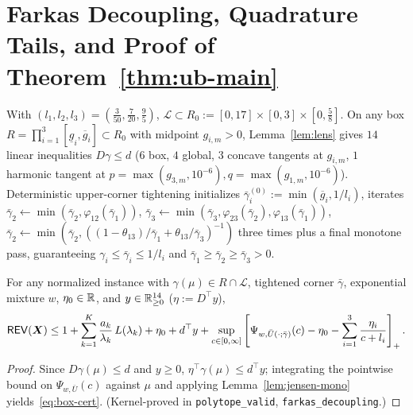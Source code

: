 \section{Farkas Decoupling, Quadrature Tails, and Proof of Theorem~\texorpdfstring{\ref{thm:ub-main}}{1.1}}\label{sec:ub-farkas}

With $(l_1,l_2,l_3) = (\frac{3}{50},\frac{7}{20},\frac{9}{5})$, $\mathcal{L} \subset R_0 := [0,17] \times [0,3] \times [0,\frac{5}{8}]$. On any box $R = \prod_{i=1}^3 [\underline{g}_i,\overline{g}_i] \subset R_0$ with midpoint $g_{i,m} > 0$, Lemma~\ref{lem:lens} gives $14$ linear inequalities $D\gamma \le d$ ($6$ box, $4$ global, $3$ concave tangents at $g_{i,m}$, $1$ harmonic tangent at $p = \max(g_{3,m}, 10^{-6}), q = \max(g_{1,m}, 10^{-6})$). Deterministic upper-corner tightening initializes $\bar{\gamma}_i^{(0)} := \min(\overline{g}_i, 1/l_i)$, iterates $\bar{\gamma}_2 \leftarrow \min(\bar{\gamma}_2, \varphi_{12}(\bar{\gamma}_1))$, $\bar{\gamma}_3 \leftarrow \min(\bar{\gamma}_3, \varphi_{23}(\bar{\gamma}_2), \varphi_{13}(\bar{\gamma}_1))$, $\bar{\gamma}_2 \leftarrow \min(\bar{\gamma}_2, ((1-\theta_{13})/\bar{\gamma}_1 + \theta_{13}/\bar{\gamma}_3)^{-1})$ three times plus a final monotone pass, guaranteeing $\gamma_i \le \bar{\gamma}_i \le 1/l_i$ and $\bar{\gamma}_1 \ge \bar{\gamma}_2 \ge \bar{\gamma}_3 > 0$.

\begin{lemma}\label{lem:farkas}
For any normalized instance with $\gamma(\mu) \in R \cap \mathcal{L}$, tightened corner $\bar{\gamma}$, exponential mixture $w$, $\eta_0 \in \mathbb{R}$, and $y \in \mathbb{R}_{\ge 0}^{14}$ ($\eta := D^\top y$),
\begin{equation}\label{eq:box-cert}
  \mathsf{REV}(\bm{X}) \le 1 + \sum_{k=1}^K \frac{a_k}{\lambda_k}\,L(\lambda_k) + \eta_0 + d^\top y
                   + \sup_{c \in [0,\infty]} \left[\Psi_{w,\bar{U}(\cdot;\bar{\gamma})}(c) - \eta_0 - \sum_{i=1}^3 \frac{\eta_i}{c + l_i}\right]_+.
\end{equation}
\end{lemma}

\begin{proof}
Since $D\gamma(\mu) \le d$ and $y \ge 0$, $\eta^\top\gamma(\mu) \le d^\top y$; integrating the pointwise bound on $\Psi_{w,\bar{U}}(c)$ against $\mu$ and applying Lemma~\ref{lem:jensen-mono} yields~\eqref{eq:box-cert}. (Kernel-proved in \texttt{polytope\_valid}, \texttt{farkas\_decoupling}.)
\end{proof}

